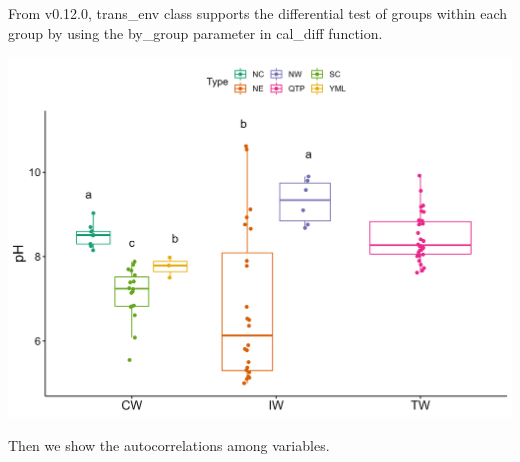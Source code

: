 \documentclass[
]{book}
\newenvironment{Shaded}{\begin{snugshade}}{\end{snugshade}}
\newcommand{\AttributeTok}[1]{\textcolor[rgb]{0.77,0.63,0.00}{#1}}
\newcommand{\CommentTok}[1]{\textcolor[rgb]{0.56,0.35,0.01}{\textit{#1}}}
\newcommand{\DecValTok}[1]{\textcolor[rgb]{0.00,0.00,0.81}{#1}}
\newcommand{\FunctionTok}[1]{\textcolor[rgb]{0.00,0.00,0.00}{#1}}
\newcommand{\NormalTok}[1]{#1}
\newcommand{\SpecialCharTok}[1]{\textcolor[rgb]{0.00,0.00,0.00}{#1}}
\newcommand{\StringTok}[1]{\textcolor[rgb]{0.31,0.60,0.02}{#1}}
\begin{document}
From v0.12.0, trans\_env class supports the differential test of groups within each group by using the by\_group parameter in cal\_diff function.

\begin{Shaded}
\end{Shaded}

\begin{center}\includegraphics[width=600px]{Images/plot_env_diff_bygroup} \end{center}

Then we show the autocorrelations among variables.

\begin{Shaded}
\end{Shaded}
\end{document}
